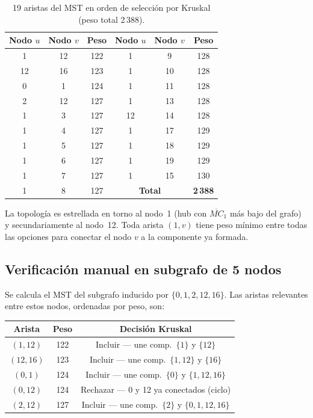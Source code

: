 \documentclass[11pt, a4paper]{article}
\begin{document}
\begin{table}[h!]
\centering\small
\begin{tabular}{ccc|ccc}
\toprule
\textbf{Nodo $u$} & \textbf{Nodo $v$} & \textbf{Peso} &
\textbf{Nodo $u$} & \textbf{Nodo $v$} & \textbf{Peso} \\
\midrule
1 & 12 & 122 & 1 &  9 & 128 \\
12 & 16 & 123 & 1 & 10 & 128 \\
0 &  1 & 124 & 1 & 11 & 128 \\
2 & 12 & 127 & 1 & 13 & 128 \\
1 &  3 & 127 & 12 & 14 & 128 \\
1 &  4 & 127 & 1 & 17 & 129 \\
1 &  5 & 127 & 1 & 18 & 129 \\
1 &  6 & 127 & 1 & 19 & 129 \\
1 &  7 & 127 & 1 & 15 & 130 \\
1 &  8 & 127 & \multicolumn{2}{c}{\textbf{Total}} & \textbf{2\,388} \\
\bottomrule
\end{tabular}
\caption{19 aristas del MST en orden de selección por Kruskal (peso total 2\,388).}
\label{tab:mst}
\end{table}

La topología es estrellada en torno al nodo~1 (hub con $\overline{MC}_1$ más bajo
del grafo) y secundariamente al nodo~12. Toda arista $(1,v)$ tiene peso mínimo
entre todas las opciones para conectar el nodo $v$ a la componente ya formada.

\subsection{Verificación manual en subgrafo de 5 nodos}

Se calcula el MST del subgrafo inducido por $\{0,1,2,12,16\}$. Las aristas relevantes
entre estos nodos, ordenadas por peso, son:

\begin{center}\small
\begin{tabular}{ccc}
\toprule
\textbf{Arista} & \textbf{Peso} & \textbf{Decisión Kruskal} \\
\midrule
$(1,12)$ & 122 & Incluir — une comp.~$\{1\}$ y $\{12\}$ \\
$(12,16)$ & 123 & Incluir — une comp.~$\{1,12\}$ y $\{16\}$ \\
$(0,1)$ & 124 & Incluir — une comp.~$\{0\}$ y $\{1,12,16\}$ \\
$(0,12)$ & 124 & Rechazar — 0 y 12 ya conectados (ciclo) \\
$(2,12)$ & 127 & Incluir — une comp.~$\{2\}$ y $\{0,1,12,16\}$ \\
\bottomrule
\end{tabular}
\end{center}
\end{document}
